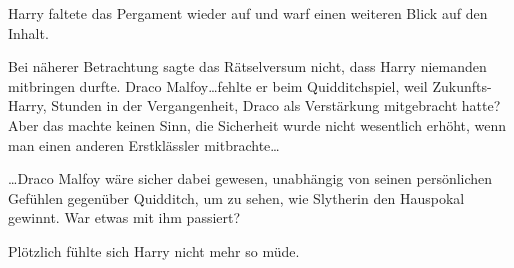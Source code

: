 Harry faltete das Pergament wieder auf und warf einen weiteren Blick auf den Inhalt.

Bei näherer Betrachtung sagte das Rätselversum nicht, dass Harry niemanden mitbringen durfte. Draco Malfoy…fehlte er beim Quidditchspiel, weil Zukunfts-Harry, Stunden in der Vergangenheit, Draco als Verstärkung mitgebracht hatte? Aber das machte keinen Sinn, die Sicherheit wurde nicht wesentlich erhöht, wenn man einen anderen Erstklässler mitbrachte…

…Draco Malfoy wäre sicher dabei gewesen, unabhängig von seinen persönlichen Gefühlen gegenüber Quidditch, um zu sehen, wie Slytherin den Hauspokal gewinnt. War etwas mit ihm passiert?

Plötzlich fühlte sich Harry nicht mehr so müde.



